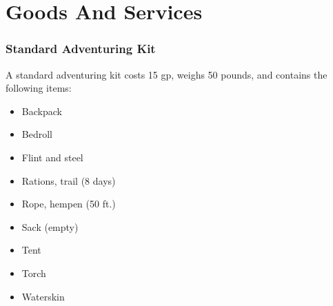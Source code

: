 \section{Goods And Services}

    \subsubsection{Standard Adventuring Kit}
        A standard adventuring kit costs 15 gp, weighs 50 pounds, and contains the following items:
        \begin{itemize}
            \item Backpack
            \item Bedroll
            \item Flint and steel
            \item Rations, trail (8 days)
            \item Rope, hempen (50 ft.)
            \item Sack (empty)
            \item Tent
            \item Torch
            \item Waterskin
        \end{itemize}

